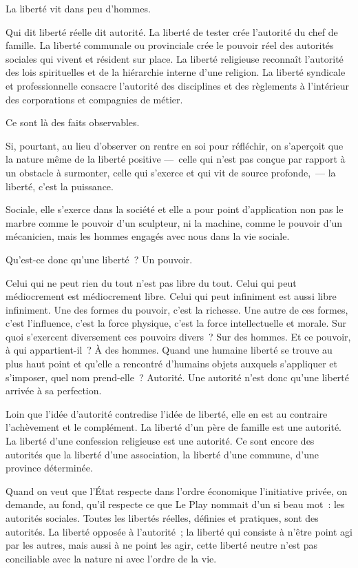 \documentclass[french,twoside]{book} %
\begin{document}
\noindent La liberté vit dans peu d’hommes.\par
Qui dit liberté réelle dit autorité. La liberté de tester crée l’autorité du chef de famille. La liberté communale ou provinciale crée le pouvoir réel des autorités sociales qui vivent et résident sur place. La liberté religieuse reconnaît l’autorité des lois spirituelles et de la hiérarchie interne d’une religion. La liberté syndicale et professionnelle consacre l’autorité des disciplines et des règlements à l’intérieur des corporations et compagnies de métier.\par
Ce sont là des faits observables.\par
Si, pourtant, au lieu d’observer on rentre en soi pour réfléchir, on s’aperçoit que la nature même de la liberté positive — celle qui n’est pas conçue par rapport à un obstacle à surmonter, celle qui s’exerce et qui vit de source profonde, — la liberté, c’est la puissance.\par
Sociale, elle s’exerce dans la société et elle a pour point d’application non pas le marbre comme le pouvoir d’un sculpteur, ni la machine, comme le pouvoir d’un mécanicien, mais les hommes engagés avec nous dans la vie sociale.\par
Qu’est-ce donc qu’une liberté ? Un pouvoir.\par
Celui qui ne peut rien du tout n’est pas libre du tout. Celui qui peut médiocrement est médiocrement libre. Celui qui peut infiniment est aussi libre infiniment. Une des formes du pouvoir, c’est la richesse. Une autre de ces formes, c’est l’influence, c’est la force physique, c’est la force intellectuelle et morale. Sur quoi s’exercent diversement ces pouvoirs divers ? Sur des hommes. Et ce pouvoir, à qui appartient-il ? À des hommes. Quand une humaine liberté se trouve au plus haut point et qu’elle a rencontré d’humains objets auxquels s’appliquer et s’imposer, quel nom prend-elle ? Autorité. Une autorité n’est donc qu’une liberté arrivée à sa perfection.\par
Loin que l’idée d’autorité contredise l’idée de liberté, elle en est au contraire l’achèvement et le complément. La liberté d’un père de famille est une autorité. La liberté d’une confession religieuse est une autorité. Ce sont encore des autorités que la liberté d’une association, la liberté d’une commune, d’une province déterminée.\par
Quand on veut que l’État respecte dans l’ordre économique l’initiative privée, on demande, au fond, qu’il respecte ce que Le Play nommait d’un si beau mot : les autorités sociales. Toutes les libertés réelles, définies et pratiques, sont des autorités. La liberté opposée à l’autorité ; la liberté qui consiste à n’être point agi par les autres, mais aussi à ne point les agir, cette liberté neutre n’est pas conciliable avec la nature ni avec l’ordre de la vie.
\end{document}
